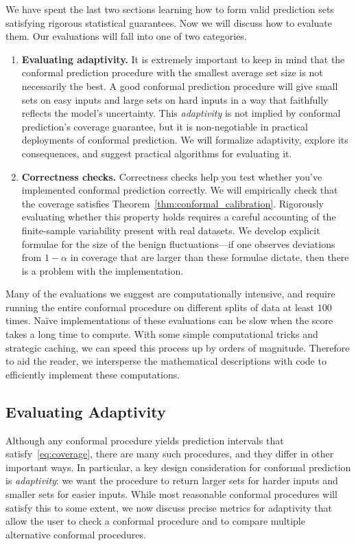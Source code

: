 \documentclass[10pt]{article}
\begin{document}
We have spent the last two sections learning how to form valid prediction sets satisfying rigorous statistical guarantees.
Now we will discuss how to evaluate them.
Our evaluations will fall into one of two categories.
\begin{enumerate}
    
    \item \textbf{Evaluating adaptivity.} It is extremely important to keep in mind that the conformal prediction procedure with the smallest average set size is not necessarily the best.
    A good conformal prediction procedure will give small sets on easy inputs and large sets on hard inputs in a way that faithfully reflects the model's uncertainty.  This \emph{adaptivity} is not implied by conformal prediction's coverage guarantee, but it is  non-negotiable in practical deployments of conformal prediction. We will formalize adaptivity, explore its consequences, and suggest practical algorithms for evaluating it.

    \item \textbf{Correctness checks.} Correctness checks help you test whether you've implemented conformal prediction correctly. We will empirically check that the coverage satisfies Theorem~\ref{thm:conformal_calibration}. Rigorously evaluating whether this property holds requires a careful accounting of the finite-sample variability present with real datasets. We develop explicit formulae for the size of the benign fluctuations---if one observes deviations from $1-\alpha$ in coverage that are larger than these formulae dictate, then there is a problem with the implementation.
 
\end{enumerate}

Many of the evaluations we suggest are computationally intensive, and require running the entire conformal procedure on different splits of data at least $100$ times.
Na\"ive implementations of these evaluations can be slow when the score takes a long time to compute.
With some simple computational tricks and strategic caching, we can speed this process up by orders of magnitude.
Therefore to aid the reader, we intersperse the mathematical descriptions with code to efficiently implement these computations.

\subsection{Evaluating Adaptivity}
Although any conformal procedure yields prediction intervals that satisfy~\eqref{eq:coverage}, there are many such procedures, and they differ in other important ways. In particular, a key design consideration for conformal prediction is \emph{adaptivity}: we want the procedure to return larger sets for harder inputs and smaller sets for easier inputs. While most reasonable conformal procedures will satisfy this to some extent, we now discuss precise metrics for adaptivity that allow the user to check a conformal procedure and to compare multiple alternative conformal procedures. 
\end{document}
